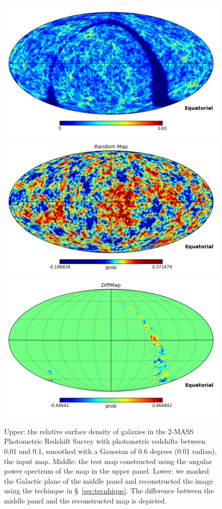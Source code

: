\documentclass[useAMS,usenatbib]{mn2e}
\begin{document}
\begin{figure}
  \includegraphics[width=\columnwidth]{cleantest_000/orig_map}
  \includegraphics[width=\columnwidth]{cleantest_000/RandMap}
  \includegraphics[width=\columnwidth]{cleantest_000/DiffMap}
  \caption{Upper: the relative surface density of galaxies in the
    2-MASS Photometric Redshift Survey with photometric redshifts
    between 0.01 and 0.1, smoothed with a Gaussian of 0.6 degrees
    (0.01 radian), the input map.  Middle: the test map constructed
    using the angular power spectrum of the map in the upper panel.
    Lower: we masked the Galactic plane of the middle panel and
    reconstructed the image using the techinque in
    \S~\ref{sec:tecnhique}.  The difference between the middle panel
    and the reconstructed map is depicted.}
  \label{fig:testmap}
\end{figure}
\end{document}
